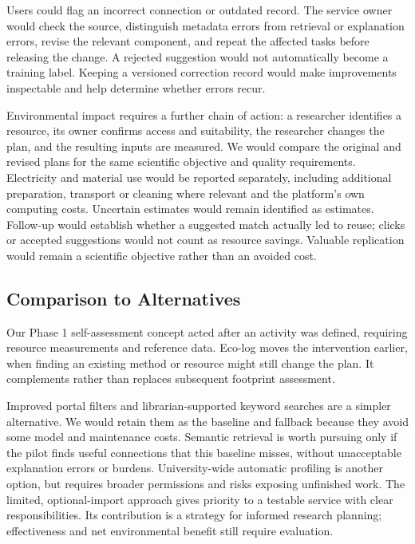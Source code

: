 \documentclass[11pt,a4paper]{article}
\begin{document}
Users could flag an incorrect connection or outdated record. The service owner would check the source, distinguish metadata errors from retrieval or explanation errors, revise the relevant component, and repeat the affected tasks before releasing the change. A rejected suggestion would not automatically become a training label. Keeping a versioned correction record would make improvements inspectable and help determine whether errors recur.

Environmental impact requires a further chain of action: a researcher identifies a resource, its owner confirms access and suitability, the researcher changes the plan, and the resulting inputs are measured. We would compare the original and revised plans for the same scientific objective and quality requirements. Electricity and material use would be reported separately, including additional preparation, transport or cleaning where relevant and the platform's own computing costs. Uncertain estimates would remain identified as estimates. Follow-up would establish whether a suggested match actually led to reuse; clicks or accepted suggestions would not count as resource savings. Valuable replication would remain a scientific objective rather than an avoided cost.

\subsection*{Comparison to Alternatives}

Our Phase 1 self-assessment concept acted after an activity was defined, requiring resource measurements and reference data. Eco-log moves the intervention earlier, when finding an existing method or resource might still change the plan. It complements rather than replaces subsequent footprint assessment.

Improved portal filters and librarian-supported keyword searches are a simpler alternative. We would retain them as the baseline and fallback because they avoid some model and maintenance costs. Semantic retrieval is worth pursuing only if the pilot finds useful connections that this baseline misses, without unacceptable explanation errors or burdens. University-wide automatic profiling is another option, but requires broader permissions and risks exposing unfinished work. The limited, optional-import approach gives priority to a testable service with clear responsibilities. Its contribution is a strategy for informed research planning; effectiveness and net environmental benefit still require evaluation.
\end{document}
